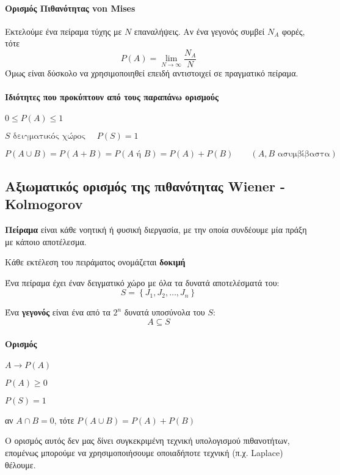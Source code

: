 \documentclass[11pt,a4paper,notitlepage,fleqn,final]{article}
\begin{document}
	\paragraph{Ορισμός Πιθανότητας von Mises}
	Εκτελούμε ένα πείραμα τύχης με \(N\) επαναλήψεις. Αν ένα
	γεγονός συμβεί \(N_A\) φορές, τότε
	\[
	P(A) = \lim_{N\to  \infty } \frac{N_A}{N}
	\]
	Όμως είναι δύσκολο να χρησιμοποιηθεί επειδή αντιστοιχεί σε
	πραγματικό πείραμα.
	\paragraph{Ιδιότητες που προκύπτουν από
		τους παραπάνω ορισμούς}
	\begin{enumroman}
		\item \( 0 \leq P(A) \leq 1 \)
		\item \( S \text{ δειγματικός χώρος } \quad
		P(S) = 1 \)
		\item \( P(A\cup B) = P(A+B) = P(A \text{ ή } B)
		= P(A) + P(B) \qquad (A,B \text{ ασυμβίβαστα})
		 \)
	\end{enumroman}

	\subsection{Αξιωματικός ορισμός της πιθανότητας
		Wiener - Kolmogorov}

	\textbf{Πείραμα} είναι κάθε νοητική ή φυσική διεργασία,
	με την οποία
	συνδέουμε μία πράξη με κάποιο αποτέλεσμα.

	Κάθε εκτέλεση του πειράματος ονομάζεται \textbf{δοκιμή}

	Ένα πείραμα έχει έναν δειγματικό χώρο με όλα τα δυνατά
	αποτελέσματά του:
	\[
	S = \left\lbrace J_1,J_2,\dots,J_n \right\rbrace
	\]

	Ένα \textbf{γεγονός} είναι ένα από τα \( 2^n \) δυνατά
	υποσύνολα του \(S\): \[ A \subseteq S \]
	\paragraph{Ορισμός}
	\( A \to P(A) \)
	\begin{enumroman}
		\item \( P(A) \geq 0 \)
		\item \( P(S) = 1 \)
		\item αν \( A \cap B = 0 \), τότε \( P(A \cup B)
		= P(A)+P(B) \)
	\end{enumroman}

	Ο ορισμός αυτός δεν μας δίνει συγκεκριμένη τεχνική υπολογισμού
	πιθανοτήτων, επομένως μπορούμε να χρησιμοποιήσουμε οποιαδήποτε
	τεχνική (π.χ. Laplace) θέλουμε.
\end{document}
